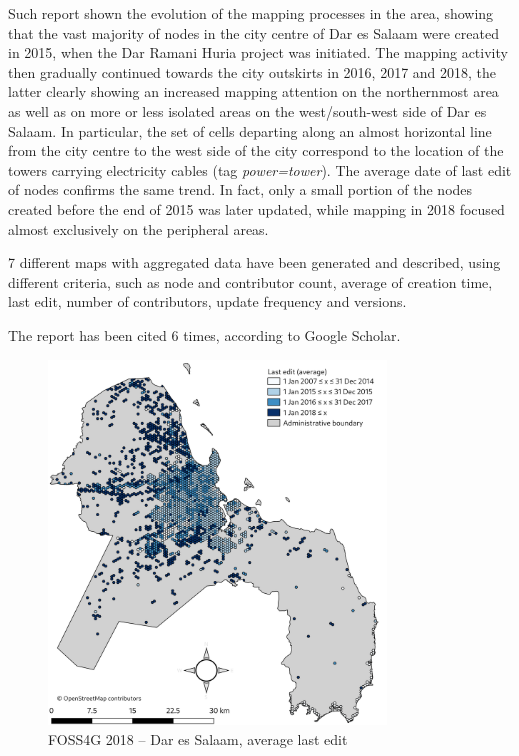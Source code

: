 \documentclass{Configuration_Files/PoliMi3i_thesis}
\begin{document}
Such report shown the evolution of the mapping processes in the area, showing that the vast majority of nodes in the city centre of Dar es Salaam were created in 2015, when the Dar Ramani Huria project was initiated. The mapping activity then gradually continued towards the city outskirts in 2016, 2017 and 2018, the latter clearly showing an increased mapping attention on the northernmost area as well as on more or less isolated areas on the west/south-west side of Dar es Salaam. In particular, the set of cells departing along an almost horizontal line from the city centre to the west side of the city correspond to the location of the towers carrying electricity cables (tag \textit{power=tower}). The average date of last edit of nodes confirms the same trend. In fact, only a small portion of the nodes created before the end of 2015 was later updated, while mapping in 2018 focused almost exclusively on the peripheral areas.

7 different maps with aggregated data have been generated and described, using different criteria, such as node and contributor count, average of creation time, last edit, number of contributors, update frequency and versions.

The report has been cited 6 times, according to Google Scholar.

\begin{figure}[ht]
    \centering
    \includegraphics[width=0.8\textwidth]{Images/dar_es_salaam_lastedit.png}
    \caption{FOSS4G 2018 – Dar es Salaam, average last edit}
    \label{fig:dar_es_salaam_lastedit}
\end{figure}
\end{document}
